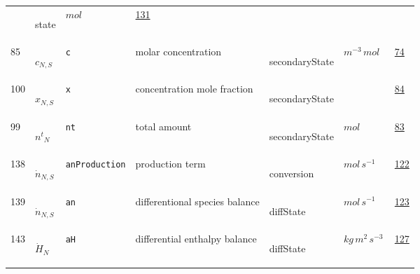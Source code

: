 \begin{longtable}{|p{1cm}|p{2.5cm}|p{4.5cm}|p{8cm}|p{3.0cm}|p{3cm}|p{1cm}|}
             & \begin{lay}state \end{lay}
             & $ mol \, $
             &                 \hyperlink{"e:131"}{ 131 }
                 \\
            85
             & \hypertarget{"v:85"}{ $ {c}{_{N, S}} $}
             & \verb|c|
             & molar concentration
             & \begin{lay}secondaryState \end{lay}
             & $ m^{-3} \,mol \, $
             &                 \hyperlink{"e:74"}{ 74 }
                 \\
            100
             & \hypertarget{"v:100"}{ $ {x}{_{N, S}} $}
             & \verb|x|
             & concentration mole fraction
             & \begin{lay}secondaryState \end{lay}
             & $  $
             &                 \hyperlink{"e:84"}{ 84 }
                 \\
            99
             & \hypertarget{"v:99"}{ $ {{n^t}}{_{N}} $}
             & \verb|nt|
             & total amount
             & \begin{lay}secondaryState \end{lay}
             & $ mol \, $
             &                 \hyperlink{"e:83"}{ 83 }
                 \\
            138
             & \hypertarget{"v:138"}{ $ {{\dot{n}}}{_{N, S}} $}
             & \verb|anProduction|
             & production term
             & \begin{lay}conversion \end{lay}
             & $ mol \,s^{-1} \, $
             &                 \hyperlink{"e:122"}{ 122 }
                 \\
            139
             & \hypertarget{"v:139"}{ $ {{\dot{n}}}{_{N, S}} $}
             & \verb|an|
             & differentional species balance
             & \begin{lay}diffState \end{lay}
             & $ mol \,s^{-1} \, $
             &                 \hyperlink{"e:123"}{ 123 }
                 \\
            143
             & \hypertarget{"v:143"}{ $ {{\dot{H}}}{_{N}} $}
             & \verb|aH|
             & differential enthalpy balance
             & \begin{lay}diffState \end{lay}
             & $ kg \,m^{2} \,s^{-3} \, $
             &                 \hyperlink{"e:127"}{ 127 }
                 \\
    \end{longtable}